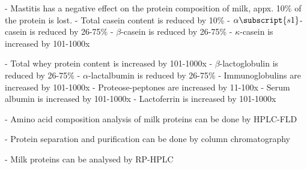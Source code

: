 - Mastitis has a negative effect on the protein composition of milk, appx. 10\% of the protein is lost.
    - Total casein content is reduced by 10\%
        - $\alpha\subscript{s1}$-casein is reduced by 26-75\%
        - $\beta$-casein is reduced by 26-75\%
        - $\kappa$-casein is increased by 101-1000x
    
    - Total whey protein content is increased by 101-1000x
        - $\beta$-lactoglobulin is reduced by 26-75\%
        - $\alpha$-lactalbumin is reduced by 26-75\%
        - Immunoglobulins are increased by 101-1000x
        - Proteose-peptones are increased by 11-100x
        - Serum albumin is increased by 101-1000x
        - Lactoferrin is increased by 101-1000x

- Amino acid composition analysis of milk proteins can be done by HPLC-FLD

- Protein separation and purification can be done by column chromatography

- Milk proteins can be analysed by RP-HPLC











